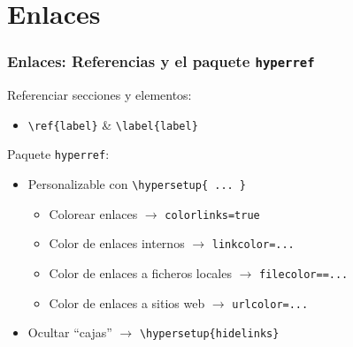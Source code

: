 \section{Enlaces}

\begin{frame}[fragile]
\frametitle{Enlaces: Referencias y el paquete \texttt{hyperref}}

Referenciar secciones y elementos:
\begin{itemize}
    \item \verb|\ref{label}| \& \verb|\label{label}|
\end{itemize}

\vspace{0.5cm}

Paquete \texttt{hyperref}:
\begin{itemize}
    \item Personalizable con \verb|\hypersetup{ ... }|
    \begin{itemize}
        \item Colorear enlaces $\rightarrow$ \texttt{colorlinks=true}
        
        \item Color de enlaces internos $\rightarrow$ \texttt{linkcolor=...}
        
        \item Color de enlaces a ficheros locales $\rightarrow$ \texttt{filecolor==...}
        
        \item Color de enlaces a sitios web $\rightarrow$ \texttt{urlcolor=...}
    \end{itemize}
    \item Ocultar ``cajas'' $\rightarrow$ \verb|\hypersetup{hidelinks}|
\end{itemize}

\vspace{0.5cm}

\end{frame}


